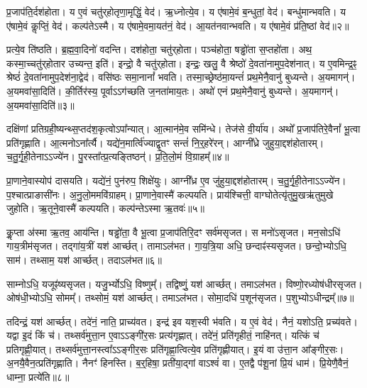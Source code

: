 प्र॒जा\-प॑ति॒र्दश॑होता।
य ए॒वं चतु॑र्‌\mbox{}होतृणा॒मृद्धिं॒ वेद॑।
ऋ॒ध्नोत्ये॒व।
य ए॑षामे॒वं ब॒न्धुतां॒ वेद॑।
बन्धु॑मान्भवति।
य ए॑षामे॒वं कॢप्तिं॒ वेद॑।
कल्प॑ते\-ऽस्मै।
य ए॑षामे॒वमा॒यत॑नं॒ वेद॑।
आ॒यत॑नवान्भवति।
य ए॑षामे॒वं प्र॑ति॒ष्ठां वेद॑॥२॥\ip

प्रत्ये॒व ति॑ष्ठति।
ब्र॒ह्म॒वा॒दिनो॑ वदन्ति।
दश॑होता॒ चतु॑र्‌\mbox{}होता।
पञ्च॑होता॒ षड्ढो॑ता स॒प्तहो॑ता।
अथ॒ कस्मा॒च्चतु॑र्‌\mbox{}होतार उच्यन्त॒ इति॑।
इन्द्रो॒ वै चतु॑र्‌\mbox{}होता।
इन्द्रः॒ खलु॒ वै श्रेष्ठो॑ दे॒वता॑नामुप॒\-देश॑नात्।
य ए॒वमिन्द्र॒ꣴ॒ श्रेष्ठं॑ दे॒वता॑नामुप॒\-देश॑ना॒द्वेद॑।
वसि॑ष्ठः समा॒नानां᳚ भवति।
तस्मा॒च्छ्रेष्ठ॑मा॒यन्तं॑ प्रथ॒मेनै॒वानु॑ बुध्यन्ते।
अ॒यमागन्॑।
अ॒यमवा॑सा॒दिति॑।
की॒र्तिर॑स्य॒ पूर्वा\-ऽऽग॑च्छति ज॒नता॑माय॒तः।
अथो॑ एनं प्रथ॒मेनै॒वानु॑ बुध्यन्ते।
अ॒यमागन्॑।
अ॒यमवा॑सा॒दिति॑॥३॥\ip\anuvakamend[स॒प्तहो॑ता प्रति॒ष्ठां वेद॑ बुध्यन्ते॒ षट्च॑]

दक्षि॑णां प्रतिग्रही॒ष्यन्थ्स॒प्तद॑श॒कृत्वो\-ऽपा᳚न्यात्।
आ॒त्मान॑मे॒व समि॑न्धे।
तेज॑से वी॒र्या॑य।
अथो᳚ प्र॒जा\-प॑तिरे॒वैनां᳚ भू॒त्वा प्रति॑\-गृह्णाति।
आ॒त्मनो\-ऽना᳚र्त्यै।
यद्ये॑न॒मार्त्वि॑ज्याद्वृ॒तꣳ सन्तं॑ नि॒र्‌॒\mbox{}हरे॑रन्।
आग्नी᳚ध्रे जुहुया॒द्दश॑होतारम्।
च॒तु॒र्गृ॒ही॒तेनाऽऽज्ये॑न।
पु॒रस्ता᳚त्प्र॒त्यङ्तिष्ठन्॑।
प्र॒ति॒लो॒मं वि॒ग्राहम्᳚॥४॥\ip

प्रा॒णाने॒वास्योप॑ दासयति।
यद्ये॑नं॒ पुन॑रुप॒ शिक्षे॑युः।
आग्नी᳚ध्र ए॒व जु॑हुया॒द्दश॑होतारम्।
च॒तु॒र्गृ॒ही॒तेनाऽऽज्ये॑न।
प॒श्चात्प्राङासी॑नः।
अ॒नु॒लो॒ममवि॑ग्राहम्।
प्रा॒णाने॒वास्मै॑ कल्पयति।
प्राय॑श्चित्ती॒ वाग्घोतेत्यृ॑तुमु॒खऋ॑तुमुखे जुहोति।
ऋ॒तूने॒वास्मै॑ कल्पयति।
कल्प॑न्ते\-ऽस्मा ऋ॒तवः॑॥५॥\ip

कॢ॒प्ता अ॑स्मा ऋ॒तव॒ आय॑न्ति।
षड्ढो॑ता॒ वै भू॒त्वा प्र॒जा\-प॑तिरि॒दꣳ सर्व॑म\-सृजत।
स मनो॑\-ऽ\-सृजत।
मन॒सोऽधि॑ गाय॒त्रीम॑\-सृजत।
तद्गा॑य॒त्रीं यश॑ आर्च्छत्।
तामाऽल॑भत।
गा॒य॒त्रि॒या अधि॒ छन्दाꣴ॑स्य\-सृजत।
छन्दो॒भ्योऽधि॒ साम॑।
तथ्साम॒ यश॑ आर्च्छत्।
तदाऽल॑भत॥६॥\ip

साम्नोऽधि॒ यजूꣴ॑ष्य\-सृजत।
यजु॒र्भ्योऽधि॒ विष्णुम्᳚।
तद्विष्णुं॒ यश॑ आर्च्छत्।
तमाऽल॑भत।
विष्णो॒रध्योष॑धीर\-सृजत।
ओष॑धी॒भ्योऽधि॒ सोमम्᳚।
तथ्सोमं॒ यश॑ आर्च्छत्।
तमाऽल॑भत।
सोमा॒दधि॑ प॒शून॑\-सृजत।
प॒शुभ्यो\-ऽधीन्द्रम्᳚॥७॥\ip

तदिन्द्रं॒ यश॑ आर्च्छत्।
तदे॑नं॒ नाति॒ प्राच्य॑वत।
इन्द्र॑ इव यश॒स्वी भ॑वति।
य ए॒वं वेद॑।
नैनं॒ यशोऽति॒ प्रच्य॑वते।
यद्वा इ॒दं किं च॑।
तथ्सर्व॑मुत्ता॒न ए॒वा\-ऽऽङ्गी॑र॒सः प्रत्य॑गृह्णात्।
तदे॑नं॒ प्रति॑\-गृहीतं॒ नाहि॑नत्।
यत्किं च॑ प्रति\-गृह्णी॒यात्।
तथ्सर्व॑मुत्ता॒नस्त्वा᳚\-ऽऽङ्गीर॒सः प्रति॑\-गृह्णा॒त्वित्ये॒व प्रति॑\-गृह्णीयात्।
इ॒यं वा उ॑त्ता॒न आ᳚ङ्गीर॒सः।
अ॒नयै॒वैन॒त्प्रति॑\-गृह्णाति।
नैनꣳ॑ हिनस्ति।
ब॒र्॒हिषा॒ प्रती॑या॒द्गां वाऽश्वं॑ वा।
ए॒तद्वै प॑शू॒नां प्रि॒यं धाम॑।
प्रि॒येणै॒वैनं॒ धाम्ना॒ प्रत्ये॑ति॥८॥\ip\anuvakamend[वि॒ग्राह॑मृ॒तव॒स्तदा\-ऽल॑भ॒तेन्द्रं॑ गृह्णीया॒थ्षट्च॑]

